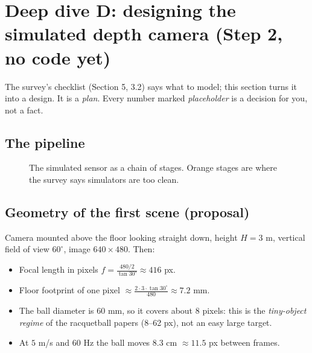 \documentclass[11pt,a4paper]{article}
\begin{document}
\section{Deep dive D: designing the simulated depth camera (Step 2, no code yet)}

\begin{idea}[Purpose]
The survey's checklist (Section 5, 3.2) says what to model; this section turns it into a design.
It is a \emph{plan}. Every number marked \emph{placeholder} is a decision for you, not a fact.
\end{idea}

\subsection{The pipeline}
\begin{figure}[H]
\centering
{}
\caption{The simulated sensor as a chain of stages. Orange stages are where the survey says
simulators are too clean.}
\end{figure}

\subsection{Geometry of the first scene \textnormal{(proposal)}}
Camera mounted above the floor looking straight down, height $H=3$ m, vertical field of view
$60^{\circ}$, image $640\times480$. Then:
\begin{itemize}
\item Focal length in pixels $f=\tfrac{480/2}{\tan 30^{\circ}}\approx 416$ px.
\item Floor footprint of one pixel $\approx \tfrac{2\cdot3\cdot\tan30^{\circ}}{480}\approx 7.2$ mm.
\item The ball diameter is $60$ mm, so it covers about $8$ pixels: this is the \emph{tiny-object
regime} of the racquetball papers (8--62 px), not an easy large target.
\item At $5$ m/s and $60$ Hz the ball moves $8.3$ cm $\approx 11.5$ px between frames.
\end{itemize}
\end{document}
